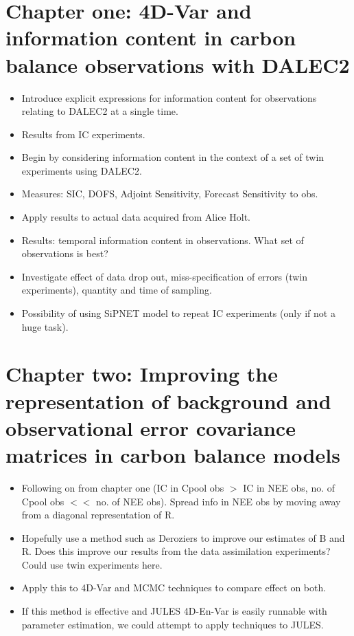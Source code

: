 \documentclass[11pt]{article}
\begin{document}
\section{Chapter one: 4D-Var and information content in carbon balance observations with DALEC2}
\begin{itemize}
\item Introduce explicit expressions for information content for observations relating to DALEC2 at a single time.
\item Results from IC experiments.
\item Begin by considering information content in the context of a set of twin experiments using DALEC2.
\item Measures: SIC, DOFS, Adjoint Sensitivity, Forecast Sensitivity to obs.
\item Apply results to actual data acquired from Alice Holt.
\item Results: temporal information content in observations. What set of observations is best?
\item Investigate effect of data drop out, miss-specification of errors (twin experiments), quantity and time of sampling.
\item Possibility of using SiPNET model to repeat IC experiments (only if not a huge task).
\end{itemize}


\section{Chapter two: Improving the representation of background and observational error covariance matrices in carbon balance models} 
\begin{itemize}
\item Following on from chapter one (IC in Cpool obs $>$ IC in NEE obs, no. of Cpool obs $<<$ no. of NEE obs). Spread info in NEE obs by moving away from a diagonal representation of R.
\item Hopefully use a method such as Deroziers to improve our estimates of B and R. Does this improve our results from the data assimilation experiments? Could use twin experiments here.
\item Apply this to 4D-Var and MCMC techniques to compare effect on both.
\item If this method is effective and JULES 4D-En-Var is easily runnable with parameter estimation, we could attempt to apply techniques to JULES. 
\end{itemize}
\end{document}
